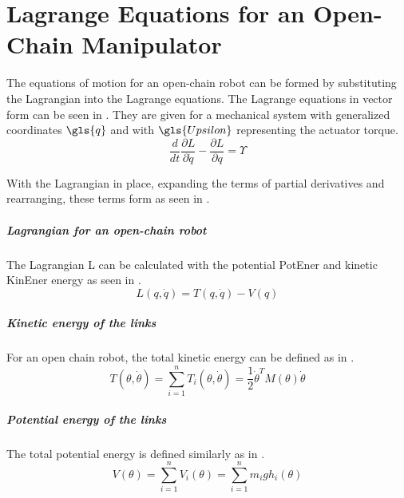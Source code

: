 \chapter{Lagrange Equations for an Open-Chain Manipulator} \label{sec:LagrangeEquations}

The equations of motion for an open-chain robot can be formed by substituting the Lagrangian into the Lagrange equations. 
The Lagrange equations in vector form can be seen in . They are given for a mechanical system with generalized coordinates $\gls{q}$ and with $\gls{Upsilon}$ representing the actuator torque.
\begin{equation} \label{eq:LagrEq}
\frac{d}{dt}\frac{\partial L}{\partial \dot{q}} - \frac{\partial L}{\partial q} = \Upsilon
\end{equation}

With the Lagrangian in place, expanding the terms of partial derivatives and rearranging, these terms form  as seen in \cite{MathIntroRobManip}. %

\paragraph{Lagrangian for an open-chain robot}

The Lagrangian \gls{L} can be calculated with the potential \gls{PotEner} and kinetic \gls{KinEner} energy as seen in . 
\begin{equation} \label{eq:Lagrangian}
L(q,\dot{q}) = T(q,\dot{q}) - V(q)
\end{equation}



\paragraph{Kinetic energy of the links}
For an open chain robot, the total kinetic energy can be defined as in .
\begin{equation}\label{eq:TotKinEn}
T(\theta,\dot{\theta}) = \sum_{i=1}^{n} T_i(\theta,\dot{\theta}) = \frac{1}{2} \dot{\theta}^T M(\theta)\dot{\theta}
\end{equation}

\paragraph{Potential energy of the links}
The total potential energy is defined similarly as in  .
\begin{equation}\label{eq:TotPotEn}
V(\theta)=\sum_{i=1}^{n} V_i(\theta) = \sum_{i=1}^{n} m_i  g  h_i(\theta)
\end{equation}

